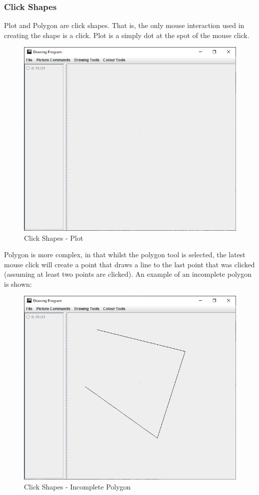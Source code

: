 \documentclass[12pt]{article} %
\begin{document}
\subsubsection{Click Shapes}
Plot and Polygon are click shapes. That is, the only mouse interaction used in creating the shape is a click. Plot is a simply dot at the spot of the mouse click.
\begin{figure}[H]
\caption{Click Shapes - Plot}
\centering
\includegraphics[scale=0.75]{pictures/clickFirstWindow.PNG}
\end{figure}

Polygon is more complex, in that whilst the polygon tool is selected, the latest mouse click will create a point that draws a line to the last point that was clicked (assuming at least two points are clicked). An example of an incomplete polygon is shown:
\begin{figure}[H]
\caption{Click Shapes - Incomplete Polygon}
\centering
\includegraphics[scale=0.75]{pictures/clickSecondWindow.PNG}
\end{figure}
\end{document}
